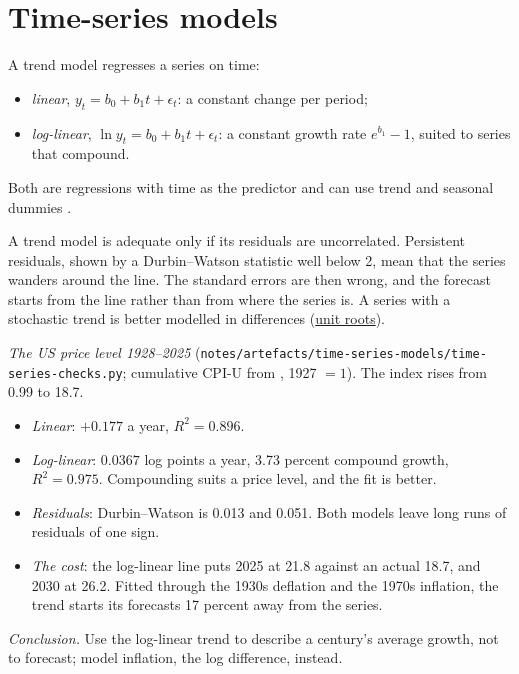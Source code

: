 \section{Time-series models}

\begin{qfmethod}\label{meth:trend-models}
 A trend model regresses a series on time:
\begin{itemize}
\item \emph{linear}, $y_t=b_0+b_1t+\epsilon_t$: a constant change per period;
\item \emph{log-linear}, $\ln y_t=b_0+b_1t+\epsilon_t$: a constant growth rate $e^{b_1}-1$, suited to series that compound.
\end{itemize}
Both are regressions with time as the predictor and can use trend and seasonal dummies \citep[sec.~7.4]{s7-hyndman}.

A trend model is adequate only if its residuals are uncorrelated. Persistent residuals, shown by a Durbin--Watson statistic well below 2, mean that the series wanders around the line. The standard errors are then wrong, and the forecast starts from the line rather than from where the series is. A series with a stochastic trend is better modelled in differences (\hyperref[def:stationarity-unit-roots]{unit roots}).

 \emph{The US price level 1928--2025} (\texttt{notes/artefacts/time-series-models/time-series-checks.py}; cumulative CPI-U from \citep[sheet ``Returns by year'']{us-asset-returns-1928-2025}, 1927 $=1$). The index rises from 0.99 to 18.7.
\begin{itemize}
\item \emph{Linear}: $+0.177$ a year, $R^2=0.896$.
\item \emph{Log-linear}: $0.0367$ log points a year, 3.73 percent compound growth, $R^2=0.975$. Compounding suits a price level, and the fit is better.
\item \emph{Residuals}: Durbin--Watson is 0.013 and 0.051. Both models leave long runs of residuals of one sign.
\item \emph{The cost}: the log-linear line puts 2025 at 21.8 against an actual 18.7, and 2030 at 26.2. Fitted through the 1930s deflation and the 1970s inflation, the trend starts its forecasts 17 percent away from the series.
\end{itemize}
\emph{Conclusion.} Use the log-linear trend to describe a century's average growth, not to forecast; model inflation, the log difference, instead.


\end{qfmethod}
